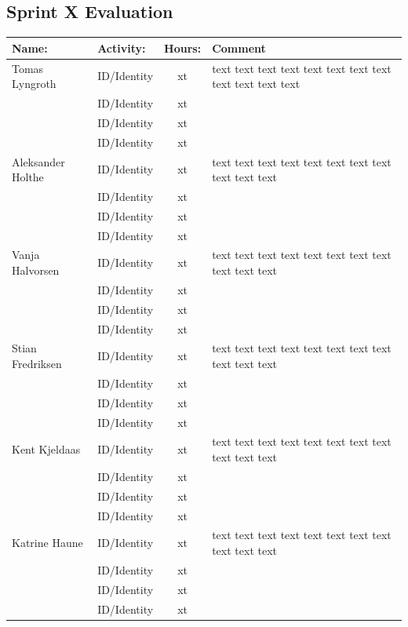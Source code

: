 \documentclass{article}
\begin{document}
\begin{center}
\section*{Sprint X Evaluation}
\begin{tabular}{|l|l|c|l|}
\hline
\rowcolor{cadetgrey}
\textbf{Name:}    &\textbf{Activity:} 	 &\textbf{Hours:}     &\textbf{Comment}  \\
\hline
Tomas Lyngroth   & ID/Identity   & xt    & text text text text text text text text text text text text\\ \rowcolor{gainsboro}
                 & ID/Identity   & xt    & \\
                 & ID/Identity   & xt    & \\\rowcolor{gainsboro}
                 & ID/Identity   & xt    & \\
\hline                                                
Aleksander Holthe& ID/Identity   & xt    & text text text text text text text text text text text\\ \rowcolor{gainsboro}
                 & ID/Identity   & xt    & \\
                 & ID/Identity   & xt    & \\\rowcolor{gainsboro}
                 & ID/Identity   & xt    & \\
\hline  
Vanja Halvorsen  & ID/Identity   & xt    & text text text text text text text text text text text\\ \rowcolor{gainsboro}
                 & ID/Identity   & xt    & \\
                 & ID/Identity   & xt    & \\\rowcolor{gainsboro}
                 & ID/Identity   & xt    & \\
\hline  
Stian Fredriksen & ID/Identity   & xt    & text text text text text text text text text text text\\ \rowcolor{gainsboro}
                 & ID/Identity   & xt    & \\
                 & ID/Identity   & xt    & \\\rowcolor{gainsboro}
                 & ID/Identity   & xt    & \\
\hline  
Kent Kjeldaas    & ID/Identity   & xt    & text text text text text text text text text text text\\ \rowcolor{gainsboro}
                 & ID/Identity   & xt    & \\
                 & ID/Identity   & xt    & \\\rowcolor{gainsboro}
                 & ID/Identity   & xt    & \\
\hline  
Katrine Haune    & ID/Identity   & xt    & text text text text text text text text text text text\\ \rowcolor{gainsboro}
                 & ID/Identity   & xt    & \\
                 & ID/Identity   & xt    & \\\rowcolor{gainsboro}
                 & ID/Identity   & xt    & \\
\hline  
\end{tabular}  

\end{center}
\end{document}
